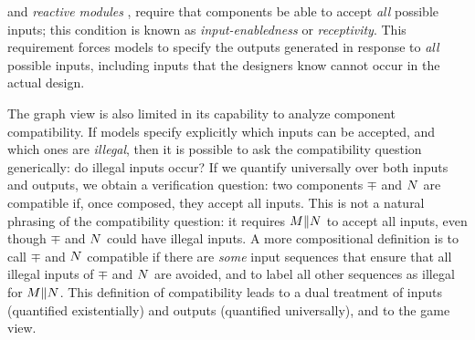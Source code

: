 \cite{LT87} and {\em reactive modules\/} \cite{RM96journal},
require that components be able to accept {\em all\/} possible
inputs; this condition is known as {\em input-enabledness\/} or {\em
receptivity}.
This requirement 
forces models to specify the outputs generated in response
to {\em all\/} possible inputs, including inputs that the designers
know cannot occur in the actual design. 
%
\begin{comment}
In turn, this creates further complications in the study of refinement. 
It is natural to require that the output behavior of $\mq$ is a subset
of that of $\mp$, when these output behaviors occur in response to
inputs that are possible in the design.
Extending the requirement also to inputs that are known not to occur
is instead problematic: such outputs are often chosen arbitrarily,
with the goal of simplifying the models or their
implementations (as in the case of hardware optimizations that
exploit ``don't care'' information about inputs). 
Thus, in input-enabled or receptive approaches, refinement is
generally checked only between {\em closed\/} systems, that have no
input from the environment; open systems are first closed by composing
them with specifically-designed components that represent the
environment. 
\end{comment}

The graph view is also limited in its capability to analyze
component compatibility.  
If models specify explicitly which inputs can be accepted, and which ones
are {\em illegal}, then it is possible to ask the compatibility
question generically: do illegal inputs occur? 
If we quantify universally over both inputs and outputs, we obtain 
a verification question: two components $\mp$ and $N$ are
compatible if, once composed, they accept all inputs.
This is not a natural phrasing of the compatibility question: it
requires $M \| N$ to accept all inputs, even though 
$\mp$ and $N$ could have illegal inputs. 
A more compositional definition is to call $\mp$
and $N$ compatible if there are {\em some\/} input sequences that
ensure that all illegal inputs of $\mp$ and $N$ are avoided, and to
label all other sequences as illegal for $M \| N$. 
This definition of compatibility leads to a dual treatment of inputs
(quantified existentially) and outputs (quantified universally), and
to the game view. 


